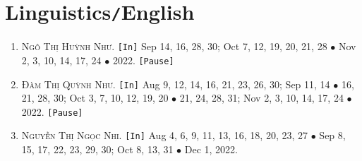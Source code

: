 \documentclass{article}
\numberwithin{equation}{section}
\begin{document}
\section{Linguistics\texttt{/}English}
\begin{enumerate}
	\item \textsc{Ngô Thị Huỳnh Như.} \texttt{[In]} Sep 14, 16, 28, 30; Oct 7, 12, 19, 20, 21, 28 $\bullet$ Nov 2, 3, 10, 14, 17, 24 $\bullet$ 2022. \texttt{[Pause]}
	\item \textsc{Đàm Thị Quỳnh Như.} \texttt{[In]} Aug 9, 12, 14, 16, 21, 23, 26, 30; Sep 11, 14 $\bullet$ 16, 21, 28, 30; Oct 3, 7, 10, 12, 19, 20 $\bullet$ 21, 24, 28, 31; Nov 2, 3, 10, 14, 17, 24 $\bullet$ 2022. \texttt{[Pause]}
	\item \textsc{Nguyễn Thị Ngọc Nhi.} \texttt{[In]} Aug 4, 6, 9, 11, 13, 16, 18, 20, 23, 27 $\bullet$ Sep 8, 15, 17, 22, 23, 29, 30; Oct 8, 13, 31 $\bullet$ Dec 1, 2022.
\end{enumerate}


\printbibliography[heading=bibintoc]
	
\end{document}

